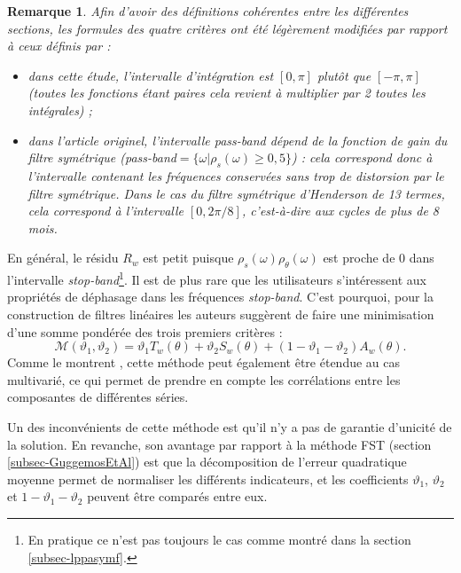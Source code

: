 \documentclass[
  12pt,
  a4paper,french]{article}
\newcommand\1{\mathds{1}}
\newtheorem*{remarque}{Remarque}
\begin{document}
\begin{remarque}

Afin d'avoir des définitions cohérentes entre les différentes sections, les formules des quatre critères ont été légèrement modifiées par rapport à ceux définis par \textcite{trilemmaWMR2019} :

\begin{itemize}
\item
  dans cette étude, l'intervalle d'intégration est \([0,\pi]\) plutôt que \([-\pi,\pi]\) (toutes les fonctions étant paires cela revient à multiplier par 2 toutes les intégrales) ;
\item
  dans l'article originel, l'intervalle pass-band dépend de la fonction de gain du filtre symétrique (pass-band\(=\{\omega |\rho_s(\omega)\geq 0,5\}\)) : cela correspond donc à l'intervalle contenant les fréquences conservées sans trop de distorsion par le filtre symétrique.
  Dans le cas du filtre symétrique d'Henderson de 13 termes, cela correspond à l'intervalle \([0, 2\pi/8]\), c'est-à-dire aux cycles de plus de 8 mois.
\end{itemize}

\end{remarque}

En général, le résidu \(R_w\) est petit puisque \(\rho_s(\omega)\rho_\theta(\omega)\) est proche de 0 dans l'intervalle \emph{stop-band}\footnote{
  En pratique ce n'est pas toujours le cas comme montré dans la section \ref{subsec-lppasymf}.}.
Il est de plus rare que les utilisateurs s'intéressent aux propriétés de déphasage dans les fréquences \emph{stop-band}.
C'est pourquoi, pour la construction de filtres linéaires les auteurs suggèrent de faire une minimisation d'une somme pondérée des trois premiers critères :
\[
\mathcal{M}(\vartheta_{1},\vartheta_{2})=\vartheta_{1}T_w(\theta)+\vartheta_{2}S_w(\theta)+(1-\vartheta_{1}-\vartheta_{2})A_w(\theta).
\]
Comme le montrent \textcite{tuckerwildi2020}, cette méthode peut également être étendue au cas multivarié, ce qui permet de prendre en compte les corrélations entre les composantes de différentes séries.

Un des inconvénients de cette méthode est qu'il n'y a pas de garantie d'unicité de la solution.
En revanche, son avantage par rapport à la méthode FST (section \ref{subsec-GuggemosEtAl}) est que la décomposition de l'erreur quadratique moyenne permet de normaliser les différents indicateurs, et les coefficients \(\vartheta_{1}\), \(\vartheta_{2}\) et \(1-\vartheta_{1}-\vartheta_{2}\) peuvent être comparés entre eux.
\end{document}
